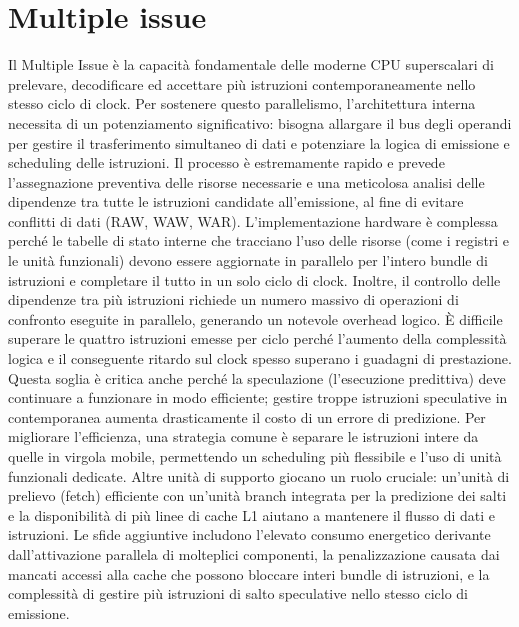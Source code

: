 \section{Multiple issue}
Il Multiple Issue è la capacità fondamentale delle moderne CPU superscalari di prelevare, decodificare ed accettare più istruzioni contemporaneamente nello stesso ciclo di clock. Per sostenere questo parallelismo, l'architettura interna necessita di un potenziamento significativo: bisogna allargare il bus degli operandi per gestire il trasferimento simultaneo di dati e potenziare la logica di emissione e scheduling delle istruzioni. Il processo è estremamente rapido e prevede l'assegnazione preventiva delle risorse necessarie e una meticolosa analisi delle dipendenze tra tutte le istruzioni candidate all'emissione, al fine di evitare conflitti di dati (RAW, WAW, WAR). L'implementazione hardware è complessa perché le tabelle di stato interne che tracciano l'uso delle risorse (come i registri e le unità funzionali) devono essere aggiornate in parallelo per l'intero bundle di istruzioni e completare il tutto in un solo ciclo di clock. Inoltre, il controllo delle dipendenze tra più istruzioni richiede un numero massivo di operazioni di confronto eseguite in parallelo, generando un notevole overhead logico. È difficile superare le quattro istruzioni emesse per ciclo perché l'aumento della complessità logica e il conseguente ritardo sul clock spesso superano i guadagni di prestazione. Questa soglia è critica anche perché la speculazione (l'esecuzione predittiva) deve continuare a funzionare in modo efficiente; gestire troppe istruzioni speculative in contemporanea aumenta drasticamente il costo di un errore di predizione. Per migliorare l'efficienza, una strategia comune è separare le istruzioni intere da quelle in virgola mobile, permettendo un scheduling più flessibile e l'uso di unità funzionali dedicate. Altre unità di supporto giocano un ruolo cruciale: un'unità di prelievo (fetch) efficiente con un'unità branch integrata per la predizione dei salti e la disponibilità di più linee di cache L1 aiutano a mantenere il flusso di dati e istruzioni. Le sfide aggiuntive includono l'elevato consumo energetico derivante dall'attivazione parallela di molteplici componenti, la penalizzazione causata dai mancati accessi alla cache che possono bloccare interi bundle di istruzioni, e la complessità di gestire più istruzioni di salto speculative nello stesso ciclo di emissione.

